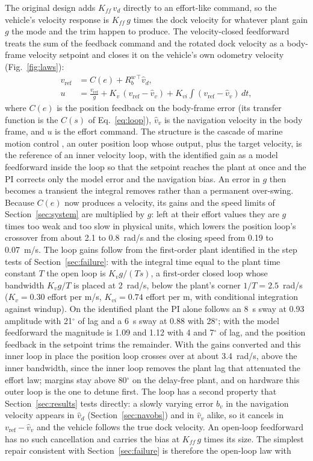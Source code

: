 The original design adds $K_{ff}\,\hat{v}_d$ directly to an effort-like command, so the vehicle's velocity response is $K_{ff}\,g$ times the dock velocity for whatever plant gain $g$ the mode and the trim happen to produce. The velocity-closed feedforward treats the sum of the feedback command and the rotated dock velocity as a body-frame velocity setpoint and closes it on the vehicle's own odometry velocity (Fig.~\ref{fig:laws}):
\begin{align}
v_{\mathrm{ref}} &= C(e) + R_b^{w\,\top}\hat{v}_d, \nonumber\\
u &= \frac{v_{\mathrm{ref}}}{g} + K_v\,(v_{\mathrm{ref}} - \hat{v}_v) + K_{vi}\!\int (v_{\mathrm{ref}} - \hat{v}_v)\,dt,
\label{eq:vloop}
\end{align}
where $C(e)$ is the position feedback on the body-frame error (its transfer function is the $C(s)$ of Eq.~\eqref{eq:loop}), $\hat{v}_v$ is the navigation velocity in the body frame, and $u$ is the effort command. The structure is the cascade of marine motion control \cite{fossen2011handbook}, an outer position loop whose output, plus the target velocity, is the reference of an inner velocity loop, with the identified gain as a model feedforward inside the loop so that the setpoint reaches the plant at once and the PI corrects only the model error and the navigation bias. An error in $g$ then becomes a transient the integral removes rather than a permanent over-swing. Because $C(e)$ now produces a velocity, its gains and the speed limits of Section~\ref{sec:system} are multiplied by $g$: left at their effort values they are $g$ times too weak and too slow in physical units, which lowers the position loop's crossover from about 2.1 to 0.8~rad/s and the closing speed from 0.19 to 0.07~m/s. The loop gains follow from the first-order plant identified in the step tests of Section~\ref{sec:failure}: with the integral time equal to the plant time constant $T$ the open loop is $K_v g / (T s)$, a first-order closed loop whose bandwidth $K_v g / T$ is placed at 2~rad/s, below the plant's corner $1/T = 2.5$~rad/s ($K_v = 0.30$ effort per m/s, $K_{vi} = 0.74$ effort per m, with conditional integration against windup). On the identified plant the PI alone follows an 8~s sway at 0.93 amplitude with 21$^\circ$ of lag and a 6~s sway at 0.88 with 28$^\circ$; with the model feedforward the magnitude is 1.09 and 1.12 with 4 and 7$^\circ$ of lag, and the position feedback in the setpoint trims the remainder. With the gains converted and this inner loop in place the position loop crosses over at about 3.4~rad/s, above the inner bandwidth, since the inner loop removes the plant lag that attenuated the effort law; margins stay above 80$^\circ$ on the delay-free plant, and on hardware this outer loop is the one to detune first. The loop has a second property that Section~\ref{sec:results} tests directly: a slowly varying error $b_v$ in the navigation velocity appears in $\hat{v}_d$ (Section~\ref{sec:navobs}) and in $\hat{v}_v$ alike, so it cancels in $v_{\mathrm{ref}} - \hat{v}_v$ and the vehicle follows the true dock velocity. An open-loop feedforward has no such cancellation and carries the bias at $K_{ff}\,g$ times its size. The simplest repair consistent with Section~\ref{sec:failure} is therefore the open-loop law with 